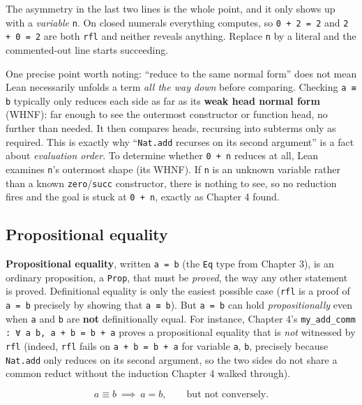 The asymmetry in the last two lines is the whole point, and it only shows up with a \emph{variable} \texttt{n}. On closed numerals everything computes, so \texttt{0 + 2 = 2} and \texttt{2 + 0 = 2} are both \texttt{rfl} and neither reveals anything. Replace \texttt{n} by a literal and the commented-out line starts succeeding.

One precise point worth noting: ``reduce to the same normal form'' does not mean Lean necessarily unfolds a term \emph{all the way down} before comparing. Checking \texttt{a ≡ b} typically only reduces each side as far as its \textbf{weak head normal form} (WHNF): far enough to see the outermost constructor or function head, no further than needed. It then compares heads, recursing into subterms only as required. This is exactly why ``\texttt{Nat.add} recurses on its second argument'' is a fact about \emph{evaluation order}. To determine whether \texttt{0 + n} reduces at all, Lean examines \texttt{n}'s outermost shape (its WHNF). If \texttt{n} is an unknown variable rather than a known \texttt{zero}/\texttt{succ} constructor, there is nothing to see, so no reduction fires and the goal is stuck at \texttt{0 + n}, exactly as Chapter 4 found.

\subsection{Propositional equality}\label{sec:05-rigor-check:04-defeq-vs-propeq:3}

\textbf{Propositional equality}, written \texttt{a = b} (the \texttt{Eq} type from Chapter 3), is an ordinary proposition, a \texttt{Prop}, that must be \emph{proved}, the way any other statement is proved. Definitional equality is only the easiest possible case (\texttt{rfl} is a proof of \texttt{a = b} precisely by showing that \texttt{a ≡ b}). But \texttt{a = b} can hold \emph{propositionally} even when \texttt{a} and \texttt{b} are \textbf{not} definitionally equal. For instance, Chapter 4's \texttt{my\_\allowbreak{}add\_\allowbreak{}comm : ∀ a b, a + b = b + a} proves a propositional equality that is \emph{not} witnessed by \texttt{rfl} (indeed, \texttt{rfl} fails on \texttt{a + b = b + a} for variable \texttt{a}, \texttt{b}, precisely because \texttt{Nat.add} only reduces on its second argument, so the two sides do not share a common reduct without the induction Chapter 4 walked through).

\[
a \equiv b \ \implies\ a = b, \qquad\text{but not conversely.}
\]

